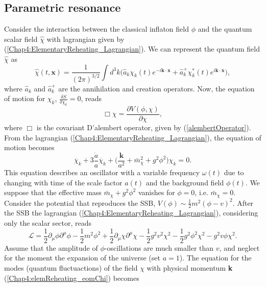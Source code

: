 \documentclass[11pt,a4paper,twoside]{book}
\begin{document}
\subsection{Parametric resonance}
Consider the interaction between the classical inflaton field $\phi$ and the quantum scalar field $\hat{\chi}$ with lagrangian given by (\ref{Chap4:ElementaryReheating_Lagrangian}). We can represent the quantum field $\hat{\chi}$ as 
\begin{equation}
	\label{Chap4:RepresentationScalarField}
	\hat{\chi}(t,\textbf{x}) = \frac{1}{(2\pi)^{3/2}}\int d^{3}k \Bigg(\hat{a}_{k} \chi_{k}(t)e^{-i\textbf{k}\cdot\textbf{x}} + \hat{a}^{+}_{k} \chi_{k}^{*}(t)e^{i\textbf{k}\cdot\textbf{x}}\Bigg),
\end{equation}
where $ \hat{a}_{k} $ and $ \hat{a}^{+}_{k} $ are the annihilation and creation operators. Now, the equation of motion for $\chi_{k}$, $ \frac{\delta S}{\delta \chi_{k}}=0 $, reads
\begin{equation}
	\label{Chap4:elemReheating_eomChi1}
	\Box \chi = \frac{\partial V(\phi,\chi)}{\partial \chi},
\end{equation}
where $\Box$ is the covariant D'alembert operator, given by (\ref{alembertOperator}). From the lagrangian (\ref{Chap4:ElementaryReheating_Lagrangian}), the equation of motion becomes
\begin{equation}
	\label{Chap4:elemReheating_eomChi}
	\ddot{\chi_{k}} + 3\frac{\dot{a}}{a}\dot{\chi_{k}} + \Bigg(\frac{\textbf{k}}{a^{2}} + \bar{m}^{2}_{\chi} + g^{2}\phi^{2}\Bigg)\chi_{k}=0.
\end{equation}
This equation describes an oscillator with a variable frequency $\omega(t)$ due to changing with time of the scale factor $ a(t) $ and the background field $ \phi(t) $. We suppose that the effective mass $ \bar{m}_{\chi} + g^{2}\phi^{2} $ vanishes for $ \phi=0 $, i.e. $  \bar{m}_{\chi}=0 $.\\
Consider the potential that reproduces the SSB, $ V(\phi) \sim \frac{1}{2} m^{2} (\phi - v)^{2} $.  After the SSB the lagrangian (\ref{Chap4:ElementaryReheating_Lagrangian}), considering only the scalar sector, reads
\begin{equation}
\label{Chap4:ParamResonanceLagrangian}
\mathcal{L}=\frac{1}{2}\partial_{\mu}\phi\partial^{\mu}\phi -\frac{1}{2}m^{2}\phi^{2}+ \frac{1}{2}\partial_{\mu} \chi \partial^{\mu}\chi-\frac{1}{2}g^{2}v^{2}\chi^{2} - \frac{1}{2}g^{2}\phi^{2}\chi^{2}-g^{2}v\phi\chi^{2}.
\end{equation}  
Assume that the amplitude of $\phi$-oscillations are much smaller than $ v $, and neglect for the moment the expansion of the universe (set $ a=1 $). The equation for the modes (quantum fluctuactions) of the field $\chi$ with physical momentum \textbf{k} (\ref{Chap4:elemReheating_eomChi}) becomes
\end{document}
